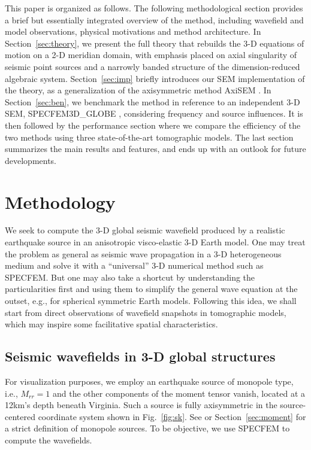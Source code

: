 \documentclass[extra,referee]{gji}
\begin{document}

This paper is organized as follows. The following methodological section
provides a brief but essentially integrated overview of the method, 
including wavefield and model observations, physical motivations and 
method architecture. 
In Section~\ref{sec:theory}, we present the full theory that rebuilds the 
3-D equations of motion on a 2-D meridian domain, with emphasis placed on 
axial singularity of seismic point sources and a narrowly banded 
structure of the dimension-reduced algebraic system. Section~\ref{sec:imp} 
briefly introduces our SEM implementation of the theory, as a
generalization of the axisymmetric method AxiSEM \cite[]{nissen2014axisem}. 
In Section~\ref{sec:ben}, we benchmark the method in reference to
an independent 3-D SEM, SPECFEM3D\_GLOBE 
\cite[SPECFEM,][]{komatitsch2002spectralI, 
komatitsch2002spectralII}, considering frequency and source influences. 
It is then followed by the performance section where we compare the
efficiency of the two methods using three state-of-the-art tomographic models.
The last section summarizes the main results and features, and 
ends up with an outlook for future developments.  

\section{Methodology}
We seek to compute the 3-D global seismic wavefield produced by a realistic 
earthquake source in an anisotropic visco-elastic 3-D Earth model. 
One may treat the problem as general as seismic wave propagation 
in a 3-D heterogeneous medium and solve it with a ``universal'' 3-D 
numerical method such as SPECFEM. 
But one may also take a shortcut by understanding the particularities 
first and using them to simplify the general wave equation at the outset, 
e.g., \cite{nissen2007axisem} for spherical symmetric Earth models.
Following this idea, we shall start from direct observations of 
wavefield snapshots in tomographic models, which may inspire some
facilitative spatial characteristics. 

\subsection{Seismic wavefields in 3-D global structures}
\label{sec:snap}
For visualization purposes, we employ an earthquake source 
of monopole type, i.e.,
$M_{rr}=1$ and the other components of the moment tensor vanish,
located at a 12km's depth beneath Virginia. 
Such a source is fully axisymmetric in the source-centered coordinate system 
shown in Fig.~\ref{fig:sk}.
See \cite{nissen2007axisem} or Section~\ref{sec:moment} for a strict 
definition of monopole sources. 
To be objective, we use SPECFEM to compute the wavefields. 
\end{document}
